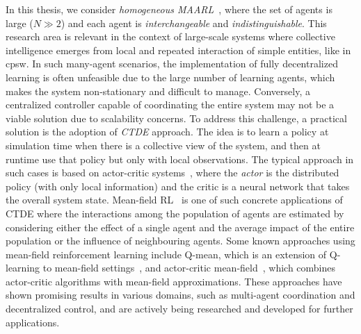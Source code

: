 In this thesis, we consider \emph{homogeneous \ac{MAARL}}~\cite{yang2021many}, 
 where the set of agents is large ($N \gg 2$) and each agent is \emph{interchangeable} and \emph{indistinguishable}.
%
This research area is relevant in the context of large-scale systems 
 where collective intelligence emerges from local and repeated interaction of simple entities, like in \ac{cpsw}.
%
In such many-agent scenarios, 
 the implementation of fully decentralized learning is often unfeasible due to the large number of learning agents, 
 which makes the system non-stationary and difficult to manage. 
%
Conversely, a centralized controller capable of coordinating 
 the entire system may not be a viable solution due to scalability concerns. 
 To address this challenge, a practical solution is the adoption of \emph{\ac{CTDE}} approach.
%
The idea is to learn a policy at simulation time when there is a collective view of the system, 
 and then at runtime use that policy but only with local observations. 
%
The typical approach in such cases is based on actor-critic systems~\cite{DBLP:conf/nips/LoweWTHAM17,wu2022more,song2022ctds,song2022centralized},
  where the \emph{actor} is the distributed policy (with only local information) and the critic is a neural network that takes the overall system state.
%
Mean-field RL~\cite{pmlr-v80-yang18d} is one of such concrete applications of \ac{CTDE} 
 where the interactions among the population of agents are estimated by considering either the effect of a single agent and the average impact of the entire population or the influence of neighbouring agents.
%
Some known approaches using mean-field reinforcement learning include Q-mean, 
 which is an extension of Q-learning to mean-field settings~\cite{yang2018mean}, 
 and actor-critic mean-field~\cite{frikha2023actor}, which combines actor-critic algorithms with mean-field approximations. 
%
These approaches have shown promising results in various domains, such as multi-agent coordination 
 and decentralized control, and are actively being researched and developed for further applications.

